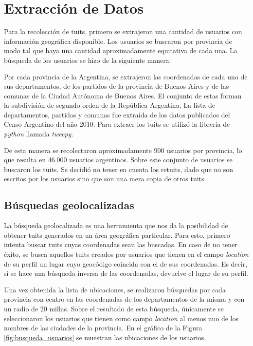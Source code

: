 

\section{Extracción de Datos}

Para la recolección de tuits, primero se extrajeron una cantidad de usuarios con información geográfica disponible.
Los usuarios se buscaron por provincia de modo tal que haya una cantidad aproximadamente equitativa de cada una.
La búsqueda de los usuarios se hizo de la siguiente manera:

Por cada provincia de la Argentina, se extrajeron las coordenadas de cada uno de sus departamentos, de los partidos de la provincia de Buenos Aires y de las comunas de la Ciudad Autónoma de Buenos Aires. El conjunto de estas forman la subdivisión de segundo orden de la República Argentina. La lista de departamentos, partidos y comunas fue extraída de los datos publicados del Censo Argentino del año 2010. Para extraer los tuits se utilizó la librería de \textit{python} llamada \textit{tweepy}.

De esta manera se recolectaron aproximadamente 900 usuarios por provincia, lo que resulta en 46.000 usuarios argentinos. Sobre este conjunto de usuarios se buscaron los tuits. Se decidió no tener en cuenta los retuits, dado que no son escritos por los usuarios sino que son una mera copia de otros tuits. 


\subsection{Búsquedas geolocalizadas}

La búsqueda geolocalizada es una herramienta que nos da la posibilidad de obtener tuits generados en un área geográfica particular. Para esto, primero intenta buscar tuits cuyas coordenadas sean las buscadas. En caso de no tener éxito, se busca aquellos tuits creados por usuarios que tienen en el campo \textit{location} de su perfil un lugar cuyo geocódigo coincida con el de sus coordenadas. Es decir, si se hace una búsqueda inversa de las coordenadas, devuelve el lugar de su perfil.

Una vez obtenida la lista de ubicaciones, se realizaron búsquedas por cada provincia con centro en las coordenadas de los departamentos de la misma y con un radio de 20 millas. Sobre el resultado de esta búsqueda, únicamente se seleccionaron los usuarios que tienen como campo \textit{location} al menos uno de los nombres de las ciudades de la provincia. 
En el gráfico de la Figura \ref{fig:busqueda_usuarios} se muestran las ubicaciones de los usuarios.


